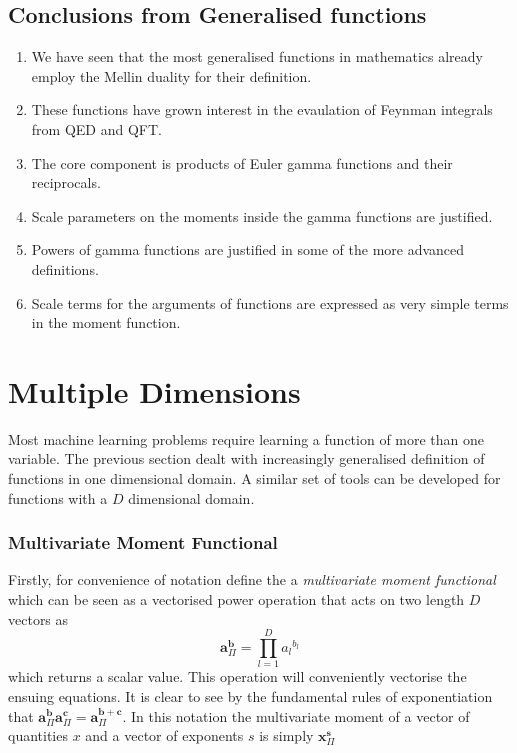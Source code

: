 \documentclass[journal=jcisd8,manuscript=article,layout=onecolumn,pdftex,floatfix,amsmath,amssymb,10pt]{achemso}
\begin{document}
\subsection{Conclusions from Generalised functions}
\begin{enumerate}
\item We have seen that the most generalised functions in mathematics already employ the Mellin duality for their definition.
\item These functions have grown interest in the evaulation of Feynman integrals from QED and QFT.
\item The core component is products of Euler gamma functions and their reciprocals.
\item Scale parameters on the moments inside the gamma functions are justified.
\item Powers of gamma functions are justified in some of the more advanced definitions.
\item Scale terms for the arguments of functions are expressed as very simple terms in the moment function.
\end{enumerate}


\section{Multiple Dimensions}
Most machine learning problems require learning a function of more than one variable. The previous section dealt with increasingly generalised definition of functions in one dimensional domain. A similar set of tools can be developed for functions with a $D$ dimensional domain.

\subsubsection{Multivariate Moment Functional}
Firstly, for convenience of notation define the a \emph{multivariate moment functional} which can be seen as a vectorised power operation that acts on two length $D$ vectors as
\begin{equation}
\mathbf{a}^\mathbf{b}_\Pi = \prod_{l=1}^D {a_l}^{b_l}
\end{equation}
which returns a scalar value. This operation will conveniently vectorise the ensuing equations. It is clear to see by the fundamental rules of exponentiation that $\mathbf{a}^\mathbf{b}_\Pi\mathbf{a}^\mathbf{c}_\Pi = \mathbf{a}^{\mathbf{b+c}}_\Pi$.  In this notation the multivariate moment of a vector of quantities $x$ and a vector of exponents $s$ is simply $\mathbf{x}^\mathbf{s}_\Pi$
\end{document}
